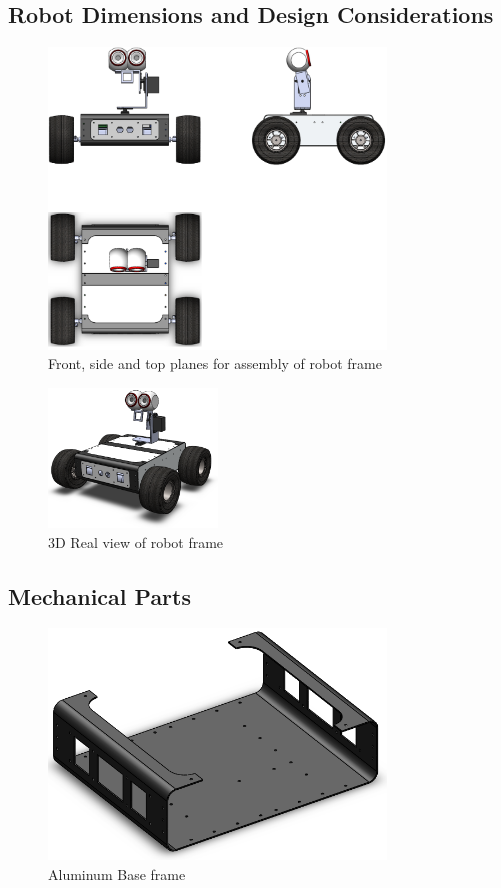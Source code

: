 \documentclass[12pt]{article}
\begin{document}
\subsection{Robot Dimensions and Design Considerations}
\begin{figure}[H]
	\centering
	\includegraphics[width =0.8\textwidth]{Fig/solid/solid-planes.png}
	\caption{Front, side and top planes for assembly of robot frame}
	\label{fig:frame-planes}
\end{figure}

\begin{figure}[H]
	\centering
	\includegraphics[width =0.4\textwidth]{Fig/Introduction.png}
	\caption{3D Real view of robot frame}
\end{figure}


\subsection{Mechanical Parts}
\begin{figure}[H]
	\centering
	\includegraphics[width =0.8\textwidth]{Fig/solid/frame-3d.png}
	\caption{Aluminum Base frame}
\end{figure}
\end{document}
